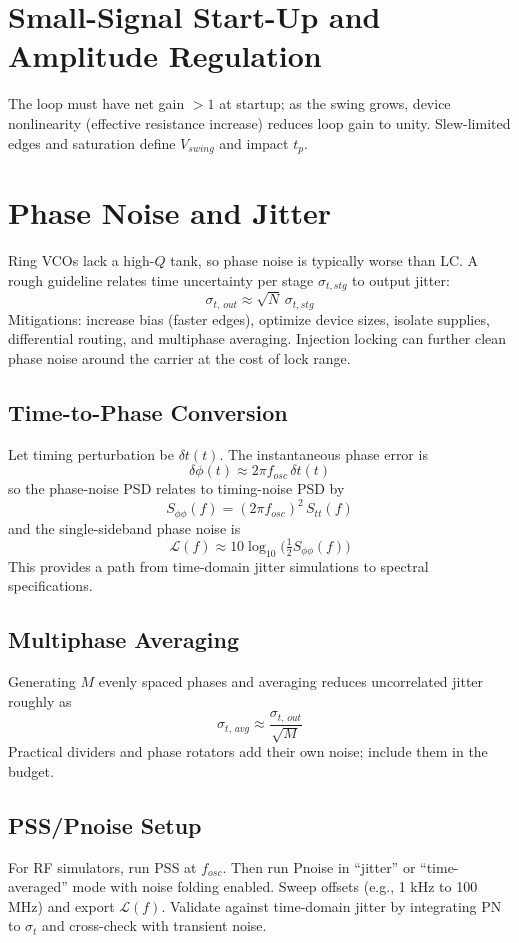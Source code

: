 \section{Small-Signal Start-Up and Amplitude Regulation}
The loop must have net gain $>1$ at startup; as the swing grows, device nonlinearity (effective resistance increase) reduces loop gain to unity. Slew-limited edges and saturation define \(V_{swing}\) and impact \(t_p\).

\section{Phase Noise and Jitter}
Ring VCOs lack a high-\(Q\) tank, so phase noise is typically worse than LC. A rough guideline relates time uncertainty per stage \(\sigma_{t,stg}\) to output jitter:
\[
 \sigma_{t,\,out} \approx \sqrt{N}\,\sigma_{t,stg}
\]
Mitigations: increase bias (faster edges), optimize device sizes, isolate supplies, differential routing, and multiphase averaging. Injection locking can further clean phase noise around the carrier at the cost of lock range.

\subsection*{Time-to-Phase Conversion}
Let timing perturbation be \(\delta t(t)\). The instantaneous phase error is
\[
 \delta\phi(t) \approx 2\pi f_{osc}\,\delta t(t)
\]
so the phase-noise PSD relates to timing-noise PSD by
\[
 S_{\phi\phi}(f) = (2\pi f_{osc})^2\, S_{tt}(f)
\]
and the single-sideband phase noise is
\[
 \mathcal{L}(f) \approx 10\log_{10}\!\Big( \tfrac{1}{2} S_{\phi\phi}(f) \Big)
\]
This provides a path from time-domain jitter simulations to spectral specifications.

\subsection*{Multiphase Averaging}
Generating \(M\) evenly spaced phases and averaging reduces uncorrelated jitter roughly as
\[
 \sigma_{t,\,avg} \approx \frac{\sigma_{t,\,out}}{\sqrt{M}}
\]
Practical dividers and phase rotators add their own noise; include them in the budget.

\subsection*{PSS/Pnoise Setup}
For RF simulators, run PSS at \(f_{osc}\). Then run Pnoise in ``jitter'' or ``time-averaged'' mode with noise folding enabled. Sweep offsets (e.g., 1 kHz to 100 MHz) and export \(\mathcal{L}(f)\). Validate against time-domain jitter by integrating PN to \(\sigma_t\) and cross-check with transient noise.

